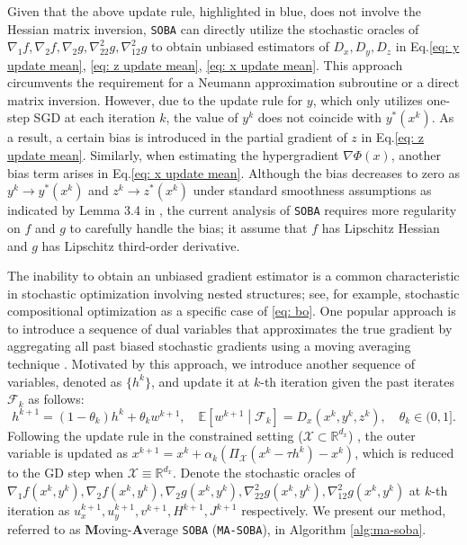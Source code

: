 \documentclass[10pt]{article}
\theoremstyle{remark}
\newcommand{\cX}{\mathcal{X}}
\def\setF{\mathscr{F}} %
\newcommand{\realset}{\mathbb{R}}
\newcommand{\E}{\mathbb{E}}
\begin{document}
Given that the above update rule, highlighted in blue, does not involve the Hessian matrix inversion, \texttt{SOBA} can directly utilize the stochastic oracles of $\nabla_1 f, \nabla_2 f, \nabla_2 g, \nabla_{22}^2 g, \nabla_{12}^2 g$ to obtain unbiased estimators of $D_x, D_y, D_z$ in Eq.\eqref{eq: y update mean}, \eqref{eq: z update mean}, \eqref{eq: x update mean}. This approach circumvents the requirement for a Neumann approximation subroutine or a direct matrix inversion. However, due to the update rule for $y$, which only utilizes one-step SGD at each iteration $k$, the value of $y^k$ does not coincide with $y^*(x^k)$. As a result, a certain bias is introduced in the partial gradient of $z$ in Eq.\eqref{eq: z update mean}. Similarly, when estimating the hypergradient $\nabla \Phi(x)$, another bias term arises in Eq.\eqref{eq: x update mean}. Although the bias decreases to zero as $y^k\rightarrow y^*(x^k)$ and $z^k\rightarrow z^*(x^k)$ under standard smoothness assumptions as indicated by Lemma 3.4 in \cite{dagreou2022framework}, the current analysis of \texttt{SOBA} requires more regularity on $f$ and $g$ to carefully handle the bias; it assume that $f$ has Lipschitz Hessian and $g$ has Lipschitz third-order derivative.

The inability to obtain an unbiased gradient estimator is a common characteristic in stochastic optimization involving nested structures; see, for example, stochastic compositional optimization \cite{wang2017stochastic, yang2019multilevel, ghadimi2020single, balasubramanian2022stochastic, chen2021solving} as a specific case of \eqref{eq: bo}. One popular approach is to introduce a sequence of dual variables that approximates the true gradient by aggregating all past biased stochastic gradients using a moving averaging technique \cite{ghadimi2020single, balasubramanian2022stochastic, xiao2022projection}. Motivated by this approach, we introduce another sequence of variables, denoted as $\{h^k\}$, and update it at $k$-th iteration given the past iterates $\setF_k$ as follows:
\begin{equation*}
    h^{k+1} = (1-\theta_k) h^k + \theta_k w^{k+1},\quad \E\left[w^{k+1}\middle|\setF_k\right] =  D_x(x^k, y^k, z^k),\quad \theta_k\in(0,1].
\end{equation*}
Following the update rule in the constrained setting ($\cX\subset\realset^{d_x}$) \cite{ghadimi2020single}, the outer variable is updated as $x^{k+1} = x^k + \alpha_k\left(\Pi_{\cX}(x^k - \tau h^k) - x^k\right)$, which is reduced to the GD step when $\cX\equiv\realset^{d_x}$. Denote the stochastic oracles of $\nabla_1 f(x^k, y^k), \nabla_2 f(x^k, y^k), \nabla_2 g(x^k, y^k), \nabla_{22}^2 g(x^k, y^k), \nabla_{12}^2 g(x^k, y^k)$ at $k$-th iteration as $u_x^{k+1}, u_y^{k+1}, v^{k+1}, H^{k+1}, J^{k+1}$ respectively. We present our method, referred to as \textbf{M}oving-\textbf{A}verage \texttt{SOBA} (\texttt{MA-SOBA}), in Algorithm \ref{alg:ma-soba}.
\end{document}
